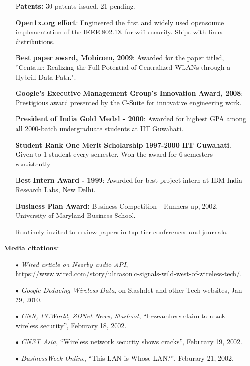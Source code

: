 \begin{resume}
    \begin{itemize}
        \item [] {\bf Patents:} 30 patents issued, 21 pending.
        \item [] {\bf Open1x.org effort}: Engineered the first and widely used opensource implementation of the IEEE
            802.1X  for wifi security. Ships with linux distributions.
        \item [] {\bf Best paper award, Mobicom, 2009}: Awarded for the paper titled, ``Centaur: Realizing the Full Potential of Centralized WLANs through a Hybrid Data Path.".
        \item [] {\bf Google's Executive Management Group's Innovation Award, 2008}: Prestigious award presented by the
            C-Suite for innovative engineering work.
        \item [] {\bf President of India Gold Medal - 2000}: Awarded for highest GPA among all 2000-batch undergraduate students at IIT Guwahati.

        \item [] {\bf Student Rank One Merit Scholarship 1997-2000 IIT Guwahati}. Given to 1 student every semester. Won
            the award for 6 semesters consistently.

        \item [] {\bf Best Intern Award - 1999}: Awarded for best project intern at IBM India Research Labs, New Delhi. 

        \item [] {\bf Business Plan Award:} Business Competition - Runners up, 2002, University of Maryland Business School.

       \item [] Routinely invited to review papers in top tier conferences and journals.
    \end{itemize}
{\bf Media citations:}
    \begin{itemize}
         \item[$\bullet$] {\em Wired article on Nearby audio API},
             https://www.wired.com/story/ultrasonic-signals-wild-west-of-wireless-tech/.
         \item[$\bullet$] {\em Google Deducing Wireless Data}, on Slashdot and other Tech websites, Jan 29, 2010.
         \item[$\bullet$] {\em CNN, PCWorld, ZDNet News, Slashdot},  ``Researchers claim to crack
           wireless security'', Feburary 18, 2002.
         \item[$\bullet$] {\em CNET Asia}, ``Wireless network security shows cracks'', Feburary 19, 2002.  
         \item[$\bullet$] {\em BusinessWeek Online}, ``This LAN is Whose LAN?'', Feburary 21, 2002. 
    \end{itemize}
\end{resume}
































